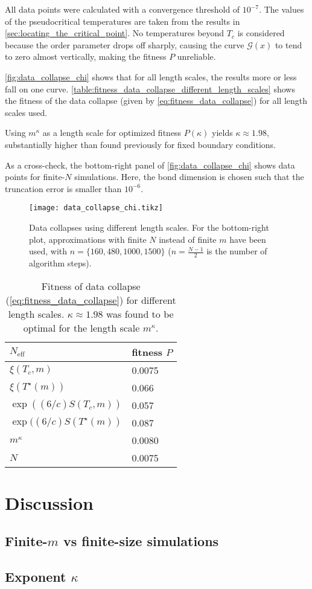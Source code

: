 All data points were calculated with a convergence threshold of $10^{-7}$.
The values of the pseudocritical temperatures are taken from the results in \autoref{sec:locating_the_critical_point}.
No temperatures beyond $T_c$ is considered because the order parameter drops off sharply,
causing the curve $\mathcal{G}(x)$ to tend to zero almost vertically, making the fitness $P$ unreliable.

\autoref{fig:data_collapse_chi} shows that for all length scales, the results more or less fall on one curve.
\autoref{table:fitness_data_collapse_different_length_scales} shows the fitness of the data collapse
\cite{bhattacharjee2001measure} (given by \autoref{eq:fitness_data_collapse}) for all length scales used.

Using $m^{\kappa}$ as a length scale for optimized fitness $P(\kappa)$ yields $\kappa \approx 1.98$,
substantially higher than found previously for fixed boundary conditions.

As a cross-check, the bottom-right panel of \autoref{fig:data_collapse_chi} shows data points for finite-$N$
simulations. Here, the bond dimension is chosen such that the truncation error is smaller than $10^{-6}$.

\begin{figure}
  \texttt{[image: data\_collapse\_chi.tikz]}
  \caption{Data collapses using different length scales.
  For the bottom-right plot, approximations with finite $N$ instead of finite $m$ have been used,
  with $n = \{160, 480, 1000, 1500 \}$ ($n = \frac{N - 1}{2}$ is the number of algorithm
  steps).}\label{fig:data_collapse_chi}
\end{figure}

\begin{table}[]
\centering
\begin{tabular}{@{}ll@{}} \toprule
$N_{\text{eff}}$                  & fitness $P$ \\ \midrule
$\xi(T_c, m)$                     & 0.0075      \\
$\xi(T^{\star}(m))$               & 0.066       \\
$\exp((6/c)S(T_c, m))$            & 0.057       \\
$\exp((6/c)S(T^{\star}(m))$       & 0.087       \\
$m^{\kappa}$                      & 0.0080      \\
$N$                               & 0.0075      \\ \bottomrule
\end{tabular}
  \caption{Fitness of data collapse (\autoref{eq:fitness_data_collapse}) for different length scales.
  $\kappa \approx 1.98$ was found to be optimal for the length scale $m^{\kappa}$.}
  \label{table:fitness_data_collapse_different_length_scales}
\end{table}


\section{Discussion}

\subsection{Finite-$m$ vs finite-size simulations}



\subsection{Exponent $\kappa$}
